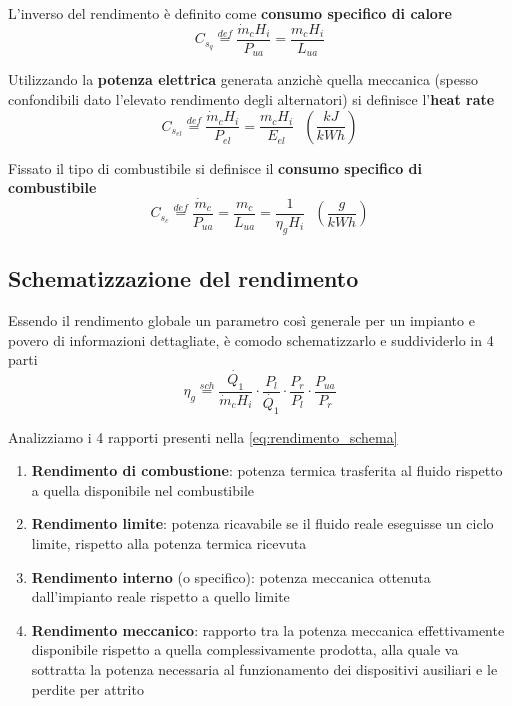 \documentclass[a4paper,10pt]{article}
\begin{document}
L'inverso del rendimento è definito come \textbf{consumo specifico di calore}
\begin{equation}
C_{s_q} \stackrel{def}{=} \frac{\dot{m}_c H_i}{P_{ua}} = \frac{m_c H_i}{L_{ua}}
\end{equation}

Utilizzando la \textbf{potenza elettrica} generata anzichè quella meccanica
(spesso confondibili dato l'elevato rendimento degli alternatori) si definisce
l'\textbf{heat rate}
\begin{equation}
 C_{s_{el}} \stackrel{def}{=} \frac{\dot{m}_c H_i}{P_{el}} = \frac{m_c H_i}{E_{el}} \ 
 \ \ \left(\frac{kJ}{kWh} \right)
\end{equation}

Fissato il tipo di combustibile si definisce il \textbf{consumo specifico di 
combustibile}
\begin{equation}
C_{s_c} \stackrel{def}{=} \frac{\dot{m}_c}{P_{ua}} = \frac{m_c}{L_{ua}} = \frac{1}
{\eta_gH_i} \ \ \ \left(\frac{g}{kWh} \right)
\end{equation}
\subsection*{Schematizzazione del rendimento}
\label{subsec:rendimento_schema}
Essendo il rendimento globale un parametro così generale per un impianto e povero
di informazioni dettagliate, è comodo schematizzarlo e suddividerlo in 4 parti
\begin{equation}
\label{eq:rendimento_schema}
 \eta_g \stackrel{sch}{=} \frac{\dot{Q_1}}{\dot{m}_c H_i}\cdot \frac{P_l}{\dot{Q_1}}
 \cdot \frac{P_r}{P_l}\cdot \frac{P_{ua}}{P_r}
\end{equation}

Analizziamo i 4 rapporti presenti nella \eqref{eq:rendimento_schema}
\begin{enumerate}
\item \textbf{Rendimento di combustione}: potenza termica trasferita al fluido 
rispetto a quella disponibile nel combustibile

\item \textbf{Rendimento limite}:
potenza ricavabile se il fluido reale eseguisse un ciclo limite, rispetto alla 
potenza termica ricevuta

\item \textbf{Rendimento interno} (o specifico): potenza meccanica ottenuta 
dall'impianto reale rispetto a quello limite

\item \textbf{Rendimento meccanico}: rapporto tra la potenza meccanica effettivamente 
disponibile rispetto a quella complessivamente prodotta, alla quale va sottratta la 
potenza necessaria al funzionamento dei dispositivi ausiliari e le perdite per 
attrito
\end{enumerate}
\end{document}
